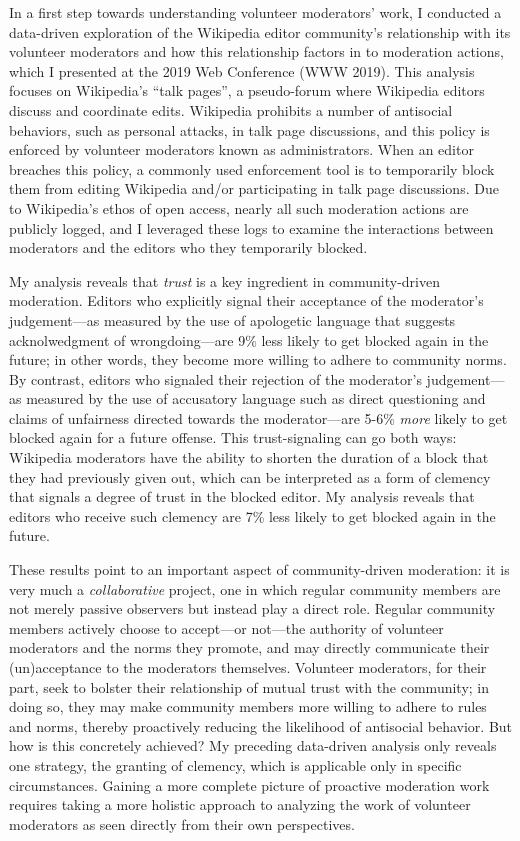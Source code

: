 \documentclass[11pt,letterpaper]{article}
\begin{document}
In a first step towards understanding volunteer moderators' work, I conducted a data-driven exploration of the Wikipedia editor community's relationship with its volunteer moderators and how this relationship factors in to moderation actions, which I presented at the 2019 Web Conference (WWW 2019).
This analysis focuses on Wikipedia's ``talk pages'', a pseudo-forum where Wikipedia editors discuss and coordinate edits.
Wikipedia prohibits a number of antisocial behaviors, such as personal attacks, in talk page discussions, and this policy is enforced by volunteer moderators known as administrators.
When an editor breaches this policy, a commonly used enforcement tool is to temporarily block them from editing Wikipedia and/or participating in talk page discussions.
Due to Wikipedia's ethos of open access, nearly all such moderation actions are publicly logged, and I leveraged these logs to examine the interactions between moderators and the editors who they temporarily blocked.

My analysis reveals that \emph{trust} is a key ingredient in community-driven moderation.
Editors who explicitly signal their acceptance of the moderator's judgement---as measured by the use of apologetic language that suggests acknolwedgment of wrongdoing---are 9\% less likely to get blocked again in the future; in other words, they become more willing to adhere to community norms.
By contrast, editors who signaled their rejection of the moderator's judgement---as measured by the use of accusatory language such as direct questioning and claims of unfairness directed towards the moderator---are 5-6\% \emph{more} likely to get blocked again for a future offense.
This trust-signaling can go both ways: Wikipedia moderators have the ability to shorten the duration of a block that they had previously given out, which can be interpreted as a form of clemency that signals a degree of trust in the blocked editor.
My analysis reveals that editors who receive such clemency are 7\% less likely to get blocked again in the future.

These results point to an important aspect of community-driven moderation: it is very much a \emph{collaborative} project, one in which regular community members are not merely passive observers but instead play a direct role.
Regular community members actively choose to accept---or not---the authority of volunteer moderators and the norms they promote, and may directly communicate their (un)acceptance to the moderators themselves.
Volunteer moderators, for their part, seek to bolster their relationship of mutual trust with the community; in doing so, they may make community members more willing to adhere to rules and norms, thereby proactively reducing the likelihood of antisocial behavior.
But how is this concretely achieved?
My preceding data-driven analysis only reveals one strategy, the granting of clemency, which is applicable only in specific circumstances.
Gaining a more complete picture of proactive moderation work requires taking a more holistic approach to analyzing the work of volunteer moderators as seen directly from their own perspectives.
\end{document}
